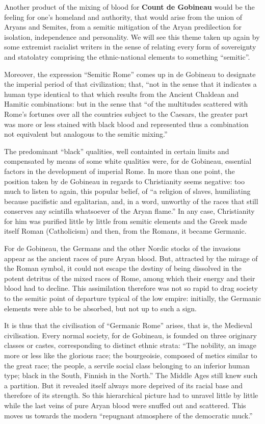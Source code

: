 \begin{quotationx}
Another product of the mixing of blood for \textbf{Count de Gobineau} would be the feeling for one's homeland and authority, that would arise from the union of Aryans and Semites, from a semitic mitigation of the Aryan predilection for isolation, independence and personality. We will see this theme taken up again by some extremist racialist writers in the sense of relating every form of sovereignty and statolatry comprising the ethnic-national elements to something ``semitic''.

Moreover, the expression ``Semitic Rome'' comes up in de Gobineau to designate the imperial period of that civilization; that, ``not in the sense that it indicates a human type identical to that which results from the Ancient Chaldean and Hamitic combinations: but in the sense that ``of the multitudes scattered with Rome's fortunes over all the countries subject to the Caesars, the greater part was more or less stained with black blood and represented thus a combination not equivalent but analogous to the semitic mixing.''

The predominant ``black'' qualities, well containted in certain limits and compensated by means of some white qualities were, for de Gobineau, essential factors in the development of imperial Rome. In more than one point, the position taken by de Gobineau in regards to Christianity seems negative: too much to listen to again, this popular belief, of ``a religion of slaves, humiliating because pacifistic and egalitarian, and, in a word, unworthy of the races that still conserves any scintilla whatsoever of the Aryan flame.'' In any case, Christianity for him was purified little by little from semitic elements and the Greek made itself Roman (Catholicism) and then, from the Romans, it became Germanic.

For de Gobineau, the Germans and the other Nordic stocks of the invasions appear as the ancient races of pure Aryan blood. But, attracted by the mirage of the Roman symbol, it could not escape the destiny of being dissolved in the potent detritus of the mixed races of Rome, among which their energy and their blood had to decline. This assimilation therefore was not so rapid to drag society to the semitic point of departure typical of the low empire: initially, the Germanic elements were able to be absorbed, but not up to such a sign.

It is thus that the civilisation of ``Germanic Rome'' arises, that is, the Medieval civilisation. Every normal society, for de Gobineau, is founded on three originary classes or castes, corresponding to distinct ethnic strata: ``The nobility, an image more or less like the glorious race; the bourgeoisie, composed of metics similar to the great race; the people, a servile social class belonging to an inferior human type; black in the South, Finnish in the North.'' The Middle Ages still knew such a partition. But it revealed itself always more deprived of its racial base and therefore of its strength. So this hierarchical picture had to unravel little by little while the last veins of pure Aryan blood were snuffed out and scattered. This moves us towards the modern ``repugnant atmosphere of the democratic muck.''


\end{quotationx}

